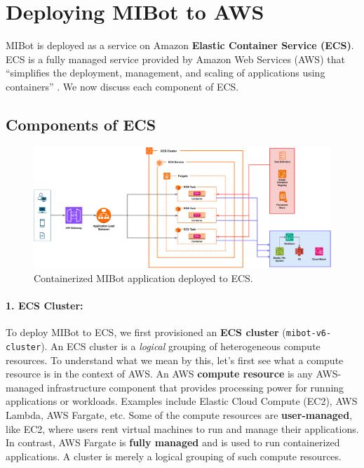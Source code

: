 \section{Deploying MIBot to AWS}
\label{sec:mibot-deployment}

MIBot is deployed as a service on Amazon \textbf{Elastic Container Service (ECS)}. ECS is a fully managed service provided by Amazon Web Services (AWS) that ``simplifies the deployment, management, and scaling of applications using containers'' \cite{aws-ecs-getting-started}. We now discuss each component of ECS.

\subsection{Components of ECS}
\begin{figure}[ht]
  \centering
  \includegraphics[width=0.99\linewidth]{fig/deployment.drawio.pdf} 
  \caption{Containerized MIBot application deployed to ECS.}
  \label{fig:ecs-components}
\end{figure}

\paragraph{1. ECS Cluster:}To deploy MIBot to ECS, we first provisioned an \textbf{ECS cluster} (\texttt{mibot-v6-cluster}). An ECS cluster is a \textit{logical} grouping of heterogeneous compute resources. To understand what we mean by this, let's first see what a compute resource is in the context of AWS. An AWS \textbf{compute resource} is any AWS-managed infrastructure component that provides processing power for running applications or workloads. Examples include Elastic Cloud Compute (EC2), AWS Lambda, AWS Fargate, etc. Some of the compute resources are \textbf{user-managed}, like EC2, where users rent virtual machines to run and manage their applications. In contrast, AWS Fargate is \textbf{fully managed} and is used to run containerized applications. A cluster is merely a logical grouping of such compute resources.

